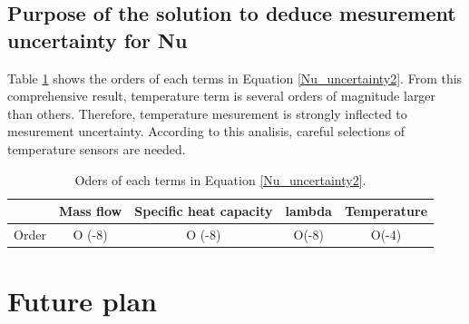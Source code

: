 \documentclass[conference]{IEEEtran}
\begin{document}
\subsection{Purpose of the solution to deduce mesurement uncertainty for Nu}
Table \ref{order} shows the orders of each terms in Equation \ref{Nu_uncertainty2}.
From this comprehensive result, temperature term is several orders of magnitude larger than others.
Therefore, temperature mesurement is strongly inflected to mesurement uncertainty.
According to this analisis, careful selections of temperature sensors are needed.
\begin{table}[h]
 \caption{Oders of each terms in Equation \ref{Nu_uncertainty2}.}
 \label{order}
 \centering
 \begin{tabular}{ccccc}
\hline
      & Mass flow & Specific heat capacity & lambda & Temperature \\ \hline
Order & O (-8)    & O (-8)                 & O(-8)  & O(-4)
 \end{tabular}
\end{table}

\section{Future plan}


\newpage
\end{document}
